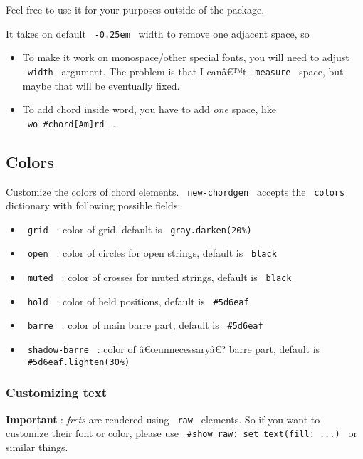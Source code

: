 Feel free to use it for your purposes outside of the package.

It takes on default \texttt{\ -0.25em\ } width to remove one adjacent
space, so

\begin{itemize}
\tightlist
\item
  To make it work on monospace/other special fonts, you will need to
  adjust \texttt{\ width\ } argument. The problem is that I canâ€™t
  \texttt{\ measure\ } space, but maybe that will be eventually fixed.
\item
  To add chord inside word, you have to add \emph{one} space, like
  \texttt{\ wo\ \#chord{[}Am{]}rd\ } .
\end{itemize}

\subsection{Colors}\label{colors}

Customize the colors of chord elements. \texttt{\ new-chordgen\ }
accepts the \texttt{\ colors\ } dictionary with following possible
fields:

\begin{itemize}
\tightlist
\item
  \texttt{\ grid\ } : color of grid, default is
  \texttt{\ gray.darken(20\%)\ }
\item
  \texttt{\ open\ } : color of circles for open strings, default is
  \texttt{\ black\ }
\item
  \texttt{\ muted\ } : color of crosses for muted strings, default is
  \texttt{\ black\ }
\item
  \texttt{\ hold\ } : color of held positions, default is
  \texttt{\ \#5d6eaf\ }
\item
  \texttt{\ barre\ } : color of main barre part, default is
  \texttt{\ \#5d6eaf\ }
\item
  \texttt{\ shadow-barre\ } : color of â€œunnecessaryâ€? barre part,
  default is \texttt{\ \#5d6eaf.lighten(30\%)\ }
\end{itemize}

\subsubsection{Customizing text}\label{customizing-text}

\textbf{Important} : \emph{frets} are rendered using \texttt{\ raw\ }
elements. So if you want to customize their font or color, please use
\texttt{\ \#show\ raw:\ set\ text(fill:\ ...)\ } or similar things.

